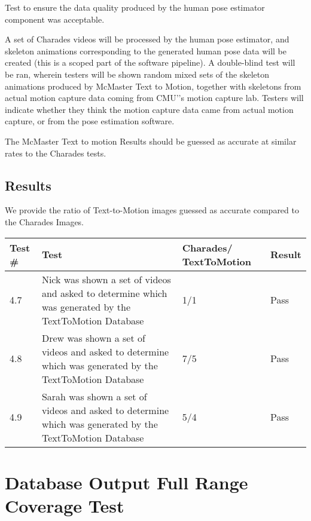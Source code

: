 \documentclass{scrreprt}
\begin{document}
Test to ensure the data quality produced by the human pose estimator component
was acceptable.

A set of Charades videos will be processed by the human pose estimator, and
skeleton animations corresponding to the generated human pose data will be
created (this is a scoped part of the software pipeline). A double-blind test
will be ran, wherein testers will be shown random mixed sets of the skeleton
animations produced by McMaster Text to Motion, together with skeletons from
actual motion capture data coming from CMU'’s motion capture lab. Testers will
indicate whether they think the motion capture data came from actual motion
capture, or from the pose estimation software.

The McMaster Text to motion Results should be guessed as accurate at similar
rates to the Charades tests.

\subsection{Results}

We provide the ratio of Text-to-Motion images guessed as accurate compared to the Charades Images.

\begin{table}[H]
        \centering
        \begin{tabular}{||p{0.75cm}|p{7.5cm}|p{2.5cm}|p{2.5cm}||}
                \hline
                \textbf Test \# & \textbf Test & \textbf Charades/ TextToMotion & \textbf Result\\
                \hline\hline
                4.7 & Nick was shown a set of videos and asked to determine which was generated by the TextToMotion Database &  1/1 & Pass\\
                \hline
                4.8 & Drew was shown a set of videos and asked to determine which was generated by the TextToMotion Database&  7/5  & Pass\\
                \hline
                4.9 & Sarah was shown a set of videos and asked to determine which was generated by the TextToMotion Database& 5/4 & Pass\\
                \hline
        \end{tabular}
\end{table}

\section{Database Output Full Range Coverage Test}
\end{document}
